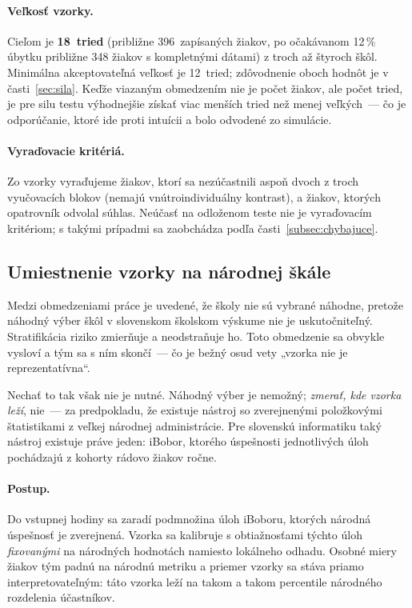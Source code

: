 \paragraph{Veľkosť vzorky.} Cieľom je \textbf{18~tried} (približne 396~zapísaných žiakov, po očakávanom 12\,\% úbytku približne 348 žiakov s kompletnými dátami) z troch až štyroch škôl. Minimálna akceptovateľná veľkosť je 12~tried; zdôvodnenie oboch hodnôt je v časti~\ref{sec:sila}. Keďže viazaným obmedzením nie je počet žiakov, ale počet tried, je pre silu testu výhodnejšie získať viac menších tried než menej veľkých~--- čo je odporúčanie, ktoré ide proti intuícii a bolo odvodené zo simulácie.

\paragraph{Vyraďovacie kritériá.} Zo vzorky vyraďujeme žiakov, ktorí sa nezúčastnili aspoň dvoch z troch vyučovacích blokov (nemajú vnútroindividuálny kontrast), a žiakov, ktorých opatrovník odvolal súhlas. Neúčasť na odloženom teste nie je vyraďovacím kritériom; s takými prípadmi sa zaobchádza podľa časti~\ref{subsec:chybajuce}.

\subsection{Umiestnenie vzorky na národnej škále}
\label{sec:narodne-ukotvenie}

Medzi obmedzeniami práce je uvedené, že školy nie sú vybrané náhodne, pretože náhodný výber škôl v slovenskom školskom výskume nie je uskutočniteľný. Stratifikácia riziko zmierňuje a neodstraňuje ho. Toto obmedzenie sa obvykle vysloví a tým sa s ním skončí~--- čo je bežný osud vety „vzorka nie je reprezentatívna“.

Nechať to tak však nie je nutné. Náhodný výber je nemožný; \emph{zmerať, kde vzorka leží}, nie~--- za predpokladu, že existuje nástroj so zverejnenými položkovými štatistikami z veľkej národnej administrácie. Pre slovenskú informatiku taký nástroj existuje práve jeden: iBobor, ktorého úspešnosti jednotlivých úloh pochádzajú z kohorty rádovo \nanCohort{} žiakov ročne.

\paragraph{Postup.} Do vstupnej hodiny sa zaradí podmnožina úloh iBoboru, ktorých národná úspešnosť je zverejnená. Vzorka sa kalibruje s obtiažnosťami týchto úloh \emph{fixovanými} na národných hodnotách namiesto lokálneho odhadu. Osobné miery žiakov tým padnú na národnú metriku a priemer vzorky sa stáva priamo interpretovateľným: táto vzorka leží na takom a takom percentile národného rozdelenia účastníkov.

